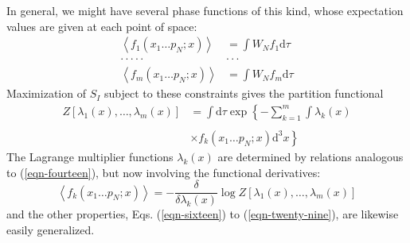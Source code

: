 \documentclass[]{article}
\begin{document}
In general, we might have several phase functions of this kind, whose expectation values are given at each point of space:
\begin{align}
\left\langle f_{1}\left(x_{1} \ldots p_{N} ; x\right)\right\rangle &=\int W_{N} f_{1}\text{d}\tau \nonumber \\
\cdot \cdot \cdot \cdot \cdot & \cdot \cdot \cdot \label{eqn-sixty-nine}\\
\left\langle f_{m}\left(x_{1} \ldots p_{N} ; x\right)\right\rangle &=\int W_{N} f_{m}\text{d}\tau \nonumber
\end{align}
Maximization of $S_{I}$ subject to these constraints gives the partition functional
\begin{align}
Z \left[\lambda_{1}(x), \ldots, \lambda_{m}(x)\right] &=\int\text{d}\tau \exp \left\{-\sum_{ k =1}^{m} \int \lambda_{ k }( x )\right. \nonumber \\
\label{eqn-seventy} \\
&\left.\times f _{ k }\left(x_{1} \ldots p _{ N } ; x \right)\text{d}^{3} x \right\} \nonumber
\end{align}
The Lagrange multiplier functions $\lambda_{k}(x)$ are determined by relations analogous to (\ref{eqn-fourteen}), but now involving the functional derivatives:
\begin{equation}
\left\langle f _{ k }\left( x _{1} \ldots p _{ N } ; x \right)\right\rangle=-\frac{\delta}{\delta \lambda_{ k }( x )} \log Z \left[\lambda_{1}( x ), \ldots, \lambda_{ m }( x )\right] \label{eqn-seventy-one}
\end{equation}
and the other properties, Eqs. (\ref{eqn-sixteen}) to (\ref{eqn-twenty-nine}), are likewise easily generalized. 
\end{document}
